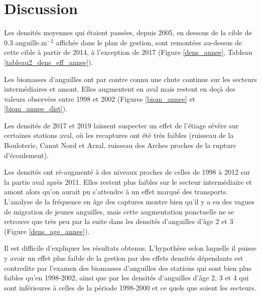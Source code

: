 \documentclass[10pt,twocolumn,titlepage,twoside]{article}\usepackage[]{graphicx}\usepackage[]{xcolor}
\begin{document}
\section*{}

%

\section[Discussion]{ Discussion}

Les densités moyennes qui étaient passées, depuis 2005, en dessous de la cible
de 0.3 anguille.m$^{-2}$ affichée dans le plan de gestion, sont remontées
au-dessus de cette cible à partir de 2014, à l'exception de 2017 
(Figure \ref{dens_annee}, Tableau \ref{tableau2_dens_eff_annee}). 

Les biomasses d'anguilles ont par contre connu une chute
continue sur les secteurs intermédiaires et amont. Elles augmentent en aval mais
restent en deçà des valeurs observées entre 1998 et 2002 (Figures
\ref{biom_annee} et \ref{biom_annee_dist}).

Les densités de 2017 et 2019 laissent suspecter un effet de l'étiage sévère sur
certaines stations aval, où les recaptures ont été très faibles 
(ruisseau de la Bouloterie, Canut Nord et Arzal, ruisseau des
Arches proches de la rupture d'écoulement).

Les densités ont
ré-augmenté à des niveaux proches de celles de 1998 à 2012 sur la partie aval
après 2011. Elles restent plus faibles sur le secteur intermédiaire et amont
alors qu'on aurait pu s'attendre à un effet marqué des transports.
L'analyse de la fréquence en âge des captures montre bien qu'il y a eu des vagues de migration 
de jeunes anguilles, mais cette augmentation ponctuelle ne se retrouve que très
peu par la suite dans les densités d'anguilles d'âge 2 et 3 (Figure
\ref{dens_age_annee}).

Il est difficile d'expliquer les résultats obtenus. 
L'hypothèse selon laquelle il puisse y avoir un effet plus faible de la gestion 
par des effets densités dépendants est contredite par l'examen des biomasses d'anguilles
des stations qui sont bien plus faibles qu'en 1998-2002, ainsi que par les densités 
d'anguilles d'âge 2, 3 et 4 qui sont inférieures à celles de la période 1998-2000 et 
ce quels que soient les secteurs. 
\end{document}
